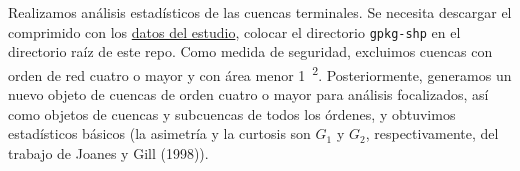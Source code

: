 \documentclass[spanish]{article}
\newenvironment{Shaded}{\begin{snugshade}}{\end{snugshade}}
\newcommand{\AttributeTok}[1]{\textcolor[rgb]{0.77,0.63,0.00}{#1}}
\newcommand{\CommentTok}[1]{\textcolor[rgb]{0.56,0.35,0.01}{\textit{#1}}}
\newcommand{\ControlFlowTok}[1]{\textcolor[rgb]{0.13,0.29,0.53}{\textbf{#1}}}
\newcommand{\DecValTok}[1]{\textcolor[rgb]{0.00,0.00,0.81}{#1}}
\newcommand{\FloatTok}[1]{\textcolor[rgb]{0.00,0.00,0.81}{#1}}
\newcommand{\FunctionTok}[1]{\textcolor[rgb]{0.00,0.00,0.00}{#1}}
\newcommand{\NormalTok}[1]{#1}
\newcommand{\OtherTok}[1]{\textcolor[rgb]{0.56,0.35,0.01}{#1}}
\newcommand{\SpecialCharTok}[1]{\textcolor[rgb]{0.00,0.00,0.00}{#1}}
\newcommand{\StringTok}[1]{\textcolor[rgb]{0.31,0.60,0.02}{#1}}
\begin{document}
Realizamos análisis estadísticos de las cuencas terminales. Se necesita
descargar el comprimido con los
\href{https://doi.org/10.5281/zenodo.8146391}{datos del estudio},
colocar el directorio \texttt{gpkg-shp} en el directorio raíz de este
repo. Como medida de seguridad, excluimos cuencas con orden de red
cuatro o mayor y con área menor 1~\textsuperscript{2}. Posteriormente,
generamos un nuevo objeto de cuencas de orden cuatro o mayor para
análisis focalizados, así como objetos de cuencas y subcuencas de todos
los órdenes, y obtuvimos estadísticos básicos (la asimetría y la
curtosis son \(G_1\) y \(G_2\), respectivamente, del trabajo de Joanes y
Gill (1998)).

\begin{Shaded}
\end{Shaded}
\end{document}
